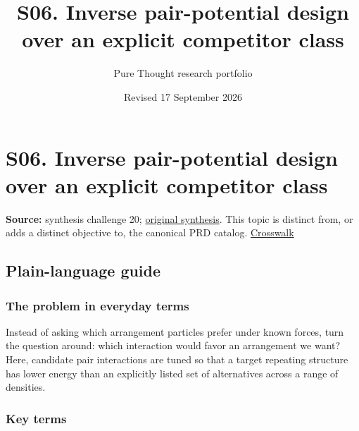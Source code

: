 \documentclass[
  11pt,
]{article}
\title{S06. Inverse pair-potential design over an explicit competitor
class}
\author{Pure Thought research portfolio}
\date{Revised 17 September 2026}
\begin{document}
\maketitle
\thispagestyle{empty}
\clearpage

\section{S06. Inverse pair-potential design over an explicit competitor
class}

\textbf{Source:} synthesis challenge 20;
\href{https://github.com/rick-stevens-ai/Pure-Thought/blob/main/NOTES/30-Most-Compelling-Pure-Thought-AI-Challenges.md}{original
synthesis}. This topic is distinct from, or adds a distinct objective
to, the canonical PRD catalog.
\href{https://github.com/rick-stevens-ai/Pure-Thought/blob/main/reviews/SYNTHESIS-CROSSWALK.md}{Crosswalk}

\subsection{Plain-language guide}

\subsubsection{The problem in everyday terms}

Instead of asking which arrangement particles prefer under known forces,
turn the question around: which interaction would favor an arrangement
we want? Here, candidate pair interactions are tuned so that a target
repeating structure has lower energy than an explicitly listed set of
alternatives across a range of densities.

\subsubsection{Key terms}
\end{document}
